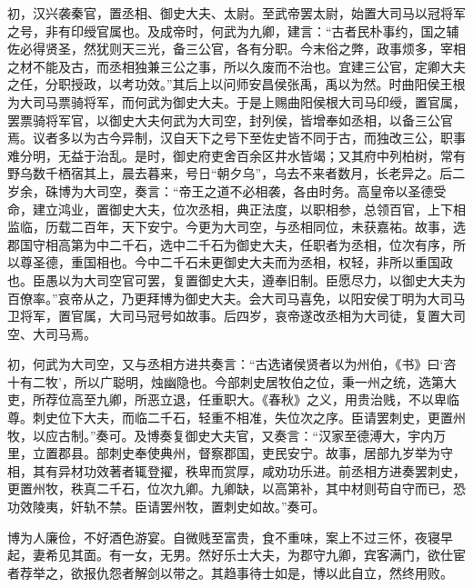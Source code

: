 \documentclass[12pt,UTF8]{ctexbook}
\begin{document}
初，汉兴袭秦官，置丞相、御史大夫、太尉。至武帝罢太尉，始置大司马以冠将军之号，非有印绶官属也。及成帝时，何武为九卿，建言：“古者民朴事约，国之辅佐必得贤圣，然犹则天三光，备三公官，各有分职。今末俗之弊，政事烦多，宰相之材不能及古，而丞相独兼三公之事，所以久废而不治也。宜建三公官，定卿大夫之任，分职授政，以考功效。”其后上以问师安昌侯张禹，禹以为然。时曲阳侯王根为大司马票骑将军，而何武为御史大夫。于是上赐曲阳侯根大司马印绶，置官属，罢票骑将军官，以御史大夫何武为大司空，封列侯，皆增奉如丞相，以备三公官焉。议者多以为古今异制，汉自天下之号下至佐史皆不同于古，而独改三公，职事难分明，无益于治乱。是时，御史府吏舍百余区井水皆竭；又其府中列柏树，常有野乌数千栖宿其上，晨去暮来，号日“朝夕乌”，乌去不来者数月，长老异之。后二岁余，硃博为大司空，奏言：“帝王之道不必相袭，各由时务。高皇帝以圣德受命，建立鸿业，置御史大夫，位次丞相，典正法度，以职相参，总领百官，上下相监临，历载二百年，天下安宁。今更为大司空，与丞相同位，未获嘉祐。故事，选郡国守相高第为中二千石，选中二千石为御史大夫，任职者为丞相，位次有序，所以尊圣德，重国相也。今中二千石未更御史大夫而为丞相，权轻，非所以重国政也。臣愚以为大司空官可罢，复置御史大夫，遵奉旧制。臣愿尽力，以御史大夫为百僚率。”哀帝从之，乃更拜博为御史大夫。会大司马喜免，以阳安侯丁明为大司马卫将军，置官属，大司马冠号如故事。后四岁，哀帝遂改丞相为大司徒，复置大司空、大司马焉。



初，何武为大司空，又与丞相方进共奏言：“古选诸侯贤者以为州伯，《书》曰‘咨十有二牧’，所以广聪明，烛幽隐也。今部刺史居牧伯之位，秉一州之统，选第大吏，所荐位高至九卿，所恶立退，任重职大。《春秋》之义，用贵治贱，不以卑临尊。刺史位下大夫，而临二千石，轻重不相准，失位次之序。臣请罢刺史，更置州牧，以应古制。”奏可。及博奏复御史大夫官，又奏言：“汉家至德溥大，宇内万里，立置郡县。部刺史奉使典州，督察郡国，吏民安宁。故事，居部九岁举为守相，其有异材功效著者辄登擢，秩卑而赏厚，咸劝功乐进。前丞相方进奏罢刺史，更置州牧，秩真二千石，位次九卿。九卿缺，以高第补，其中材则苟自守而已，恐功效陵夷，奸轨不禁。臣请罢州牧，置刺史如故。”奏可。



博为人廉俭，不好酒色游宴。自微贱至富贵，食不重味，案上不过三怀，夜寝早起，妻希见其面。有一女，无男。然好乐士大夫，为郡守九卿，宾客满门，欲仕宦者荐举之，欲报仇怨者解剑以带之。其趋事待士如是，博以此自立，然终用败。
\end{document}
